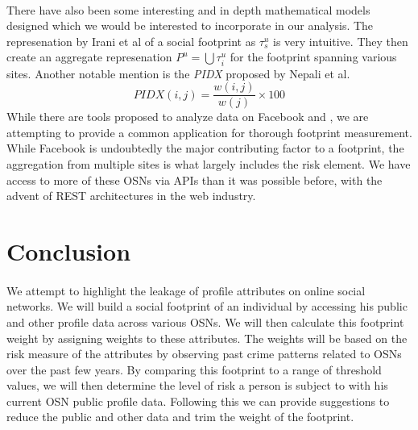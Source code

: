\documentclass[11pt]{article}
\begin{document}
\paragraph{}
There have also been some interesting and in depth mathematical models designed which we would be interested to incorporate in our analysis. The represenation by Irani et al \cite{leakage} of a social footprint as \(\tau_{s}^{u}\) is very intuitive. They then create an aggregate represenation \(P^{u}=\bigcup\tau_{i}^{u}\) for the footprint spanning various sites. Another notable mention is the {\sl PIDX} proposed by Nepali et al. \cite{pidx}
\begin{equation}
PIDX(i,j) = \frac{w(i,j)}{w(j)}\times100
\end{equation}
While there are tools proposed to analyze data on Facebook \cite{privometer} and \cite{privaware}, we are attempting to provide a common application for thorough footprint measurement. While Facebook is undoubtedly the major contributing factor to a footprint, the aggregation from multiple sites is what largely includes the risk element. We have access to more of these OSNs via APIs than it was possible before, with the advent of REST architectures in the web industry.

\section{Conclusion}

\paragraph{}
We attempt to highlight the leakage of profile attributes on online social networks. We will build a social footprint of an individual by accessing his public and other profile data across various OSNs. We will then calculate this footprint weight by assigning weights to these attributes. The weights will be based on the risk measure of the attributes by observing past crime patterns related to OSNs over the past few years. By comparing this footprint to a range of threshold values, we will then determine the level of risk a person is subject to with his current OSN public profile data. Following this we can provide suggestions to reduce the public and other data and trim the weight of the footprint.
\end{document}
